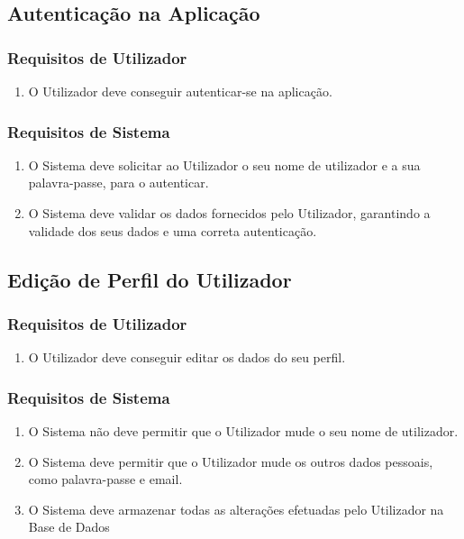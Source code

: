 \documentclass[a4paper,12pt]{scrreprt}
\begin{document}
\subsection{Autenticação na Aplicação}

\subsubsection{Requisitos de Utilizador}

\begin{enumerate}
    \item O Utilizador deve conseguir autenticar-se na aplicação.
\end{enumerate}

\subsubsection{Requisitos de Sistema }

\begin{enumerate}
    \item O Sistema deve solicitar ao Utilizador o seu nome de utilizador e a sua palavra-passe, para o autenticar.
    \item O Sistema deve validar os dados fornecidos pelo Utilizador, garantindo a validade dos seus dados e uma correta autenticação.
\end{enumerate}

\subsection{Edição de Perfil do Utilizador}

\subsubsection{Requisitos de Utilizador}

\begin{enumerate}
    \item O Utilizador deve conseguir editar os dados do seu perfil.
\end{enumerate}

\subsubsection{Requisitos de Sistema }

\begin{enumerate}
    \item O Sistema não deve permitir que o Utilizador mude o seu nome de utilizador.
    \item O Sistema deve permitir que o Utilizador mude os outros dados pessoais, como palavra-passe e email.
    \item O Sistema deve armazenar todas as alterações efetuadas pelo Utilizador na Base de Dados
\end{enumerate}
\end{document}
